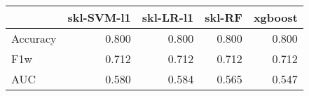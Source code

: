\begin{tabular}{lrrrr}
\toprule
{} &  skl-SVM-l1 &  skl-LR-l1 &  skl-RF &  xgboost \\
\midrule
Accuracy &       0.800 &      0.800 &   0.800 &    0.800 \\
F1w      &       0.712 &      0.712 &   0.712 &    0.712 \\
AUC      &       0.580 &      0.584 &   0.565 &    0.547 \\
\bottomrule
\end{tabular}

